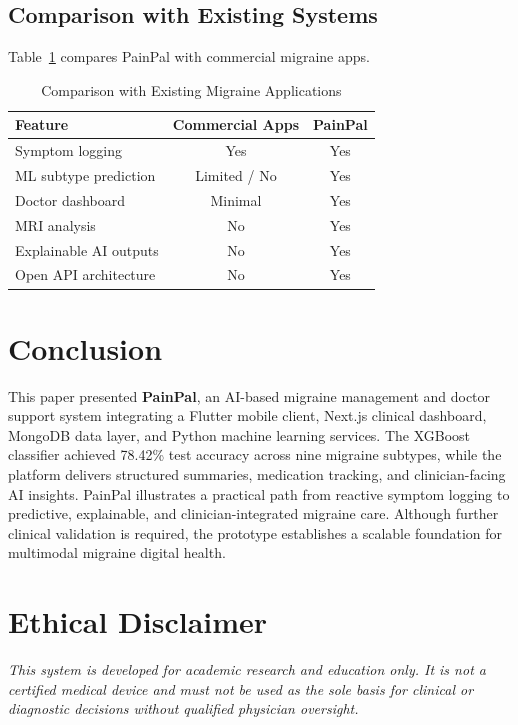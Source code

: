 \documentclass[conference,twocolumn,letterpaper]{IEEEtran}
\begin{document}
\subsection{Comparison with Existing Systems}
Table~\ref{tab:comparison} compares PainPal with commercial migraine apps.

\begin{table}[t]
\caption{Comparison with Existing Migraine Applications}
\label{tab:comparison}
\centering
\begin{tabular}{@{}lcc@{}}
\toprule
\textbf{Feature} & \textbf{Commercial Apps} & \textbf{PainPal} \\
\midrule
Symptom logging & Yes & Yes \\
ML subtype prediction & Limited / No & Yes \\
Doctor dashboard & Minimal & Yes \\
MRI analysis & No & Yes \\
Explainable AI outputs & No & Yes \\
Open API architecture & No & Yes \\
\bottomrule
\end{tabular}
\end{table}

\section{Conclusion}
This paper presented \textbf{PainPal}, an AI-based migraine management and doctor support system integrating a Flutter mobile client, Next.js clinical dashboard, MongoDB data layer, and Python machine learning services. The XGBoost classifier achieved 78.42\% test accuracy across nine migraine subtypes, while the platform delivers structured summaries, medication tracking, and clinician-facing AI insights. PainPal illustrates a practical path from reactive symptom logging to predictive, explainable, and clinician-integrated migraine care. Although further clinical validation is required, the prototype establishes a scalable foundation for multimodal migraine digital health.

\section*{Ethical Disclaimer}
\textit{This system is developed for academic research and education only. It is not a certified medical device and must not be used as the sole basis for clinical or diagnostic decisions without qualified physician oversight.}
\end{document}
